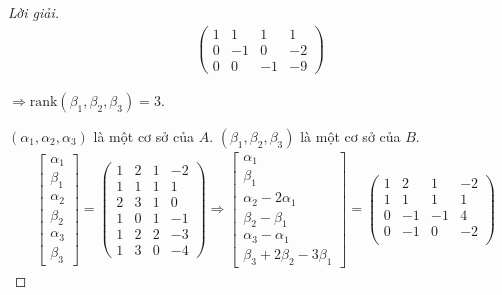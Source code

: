 \documentclass[class=linearalgebra,crop=false]{standalone}
\begin{document}
\begin{proof}[Lời giải]
\begin{align*}
        \begin{pmatrix}
            1 & 1  & 1  & 1  \\
            0 & -1 & 0  & -2 \\
            0 & 0  & -1 & -9
        \end{pmatrix}
    \end{align*}
    \par $\Rightarrow\text{rank}(\beta_{1}, \beta_{2}, \beta_{3}) = 3$.
    \par $(\alpha_{1}, \alpha_{2}, \alpha_{3})$ là một cơ sở của $A$. $(\beta_{1}, \beta_{2}, \beta_{3})$ là một cơ sở của $B$.
    \begin{align*}
                        & \begin{bmatrix}
            \alpha_{1} \\
            \beta_{1}  \\
            \alpha_{2} \\
            \beta_{2}  \\
            \alpha_{3} \\
            \beta_{3}
        \end{bmatrix}=
        \begin{pmatrix}
            1 & 2 & 1 & -2 \\
            1 & 1 & 1 & 1  \\
            2 & 3 & 1 & 0  \\
            1 & 0 & 1 & -1 \\
            1 & 2 & 2 & -3 \\
            1 & 3 & 0 & -4
        \end{pmatrix}
        \Longrightarrow
        \begin{bmatrix}
            \alpha_{1}               \\
            \beta_{1}                \\
            \alpha_{2} - 2\alpha_{1} \\
            \beta_{2} - \beta_{1}    \\
            \alpha_{3} - \alpha_{1}  \\
            \beta_{3} + 2\beta_{2} - 3\beta_{1}
        \end{bmatrix}=
        \begin{pmatrix}
            1 & 2  & 1  & -2 \\
            1 & 1  & 1  & 1  \\
            0 & -1 & -1 & 4  \\
            0 & -1 & 0  & -2 \\

\end{pmatrix}
\end{align*}
\end{proof}
\end{document}
